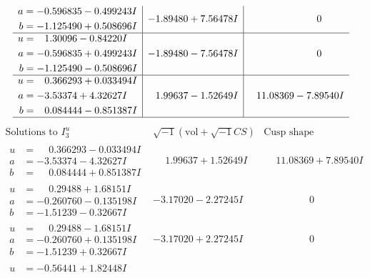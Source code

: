 \documentclass[1p]{elsarticle_modified}
\theoremstyle{definition}
\newcommand{\I}{\sqrt{-1}}
\begin{document}
$$\begin{array}{c|c|c}
\begin{aligned}
a &= -0.596835 - 0.499243 I \\
b &= -1.125490 + 0.508696 I\end{aligned}
 & -1.89480 + 7.56478 I & \phantom{-0.000000 } 0 \\ \hline\begin{aligned}
u &= \phantom{-}1.30096 - 0.84220 I \\
a &= -0.596835 + 0.499243 I \\
b &= -1.125490 - 0.508696 I\end{aligned}
 & -1.89480 - 7.56478 I & \phantom{-0.000000 } 0 \\ \hline\begin{aligned}
u &= \phantom{-}0.366293 + 0.033494 I \\
a &= -3.53374 + 4.32627 I \\
b &= \phantom{-}0.084444 - 0.851387 I\end{aligned}
 & \phantom{-}1.99637 - 1.52649 I & \phantom{-}11.08369 - 7.89540 I\\
 \hline 
 \end{array}$$\newpage$$\begin{array}{c|c|c}  
\text{Solutions to }I^u_{3}& \I (\text{vol} + \sqrt{-1}CS) & \text{Cusp shape}\\
 \hline 
\begin{aligned}
u &= \phantom{-}0.366293 - 0.033494 I \\
a &= -3.53374 - 4.32627 I \\
b &= \phantom{-}0.084444 + 0.851387 I\end{aligned}
 & \phantom{-}1.99637 + 1.52649 I & \phantom{-}11.08369 + 7.89540 I \\ \hline\begin{aligned}
u &= \phantom{-}0.29488 + 1.68151 I \\
a &= -0.260760 - 0.135198 I \\
b &= -1.51239 - 0.32667 I\end{aligned}
 & -3.17020 - 2.27245 I & \phantom{-0.000000 } 0 \\ \hline\begin{aligned}
u &= \phantom{-}0.29488 - 1.68151 I \\
a &= -0.260760 + 0.135198 I \\
b &= -1.51239 + 0.32667 I\end{aligned}
 & -3.17020 + 2.27245 I & \phantom{-0.000000 } 0 \\ \hline\begin{aligned}
u &= -0.56441 + 1.82448 I \\

\end{aligned}
\end{array}$$
\end{document}
